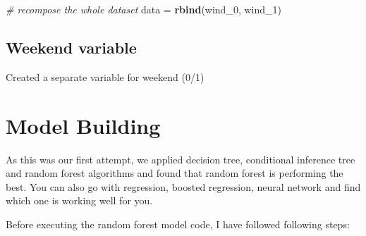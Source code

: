 \documentclass[]{book}
\newenvironment{Shaded}{\begin{snugshade}}{\end{snugshade}}
\newcommand{\CommentTok}[1]{\textcolor[rgb]{0.56,0.35,0.01}{\textit{#1}}}
\newcommand{\DecValTok}[1]{\textcolor[rgb]{0.00,0.00,0.81}{#1}}
\newcommand{\KeywordTok}[1]{\textcolor[rgb]{0.13,0.29,0.53}{\textbf{#1}}}
\newcommand{\NormalTok}[1]{#1}
\newcommand{\OperatorTok}[1]{\textcolor[rgb]{0.81,0.36,0.00}{\textbf{#1}}}
\newcommand{\StringTok}[1]{\textcolor[rgb]{0.31,0.60,0.02}{#1}}
\begin{document}
\begin{Shaded}
\begin{Highlighting}[]
\CommentTok{# recompose the whole dataset}
\NormalTok{data =}\StringTok{ }\KeywordTok{rbind}\NormalTok{(wind_}\DecValTok{0}\NormalTok{, wind_}\DecValTok{1}\NormalTok{)}
\end{Highlighting}
\end{Shaded}

\begin{Shaded}
\end{Shaded}

\hypertarget{weekend-variable}{%
\subsection{Weekend variable}\label{weekend-variable}}

Created a separate variable for weekend (0/1)

\begin{Shaded}
\end{Shaded}

\hypertarget{model-building}{%
\section{Model Building}\label{model-building}}

As this was our first attempt, we applied decision tree, conditional inference tree and random forest algorithms and found that random forest is performing the best. You can also go with regression, boosted regression, neural network and find which one is working well for you.

Before executing the random forest model code, I have followed following steps:
\end{document}
